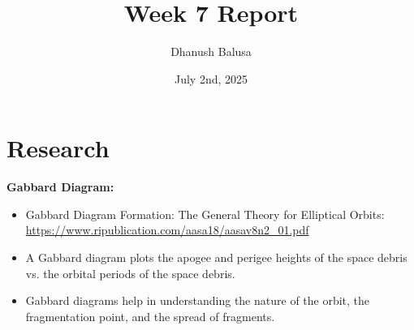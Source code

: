\documentclass[12pt]{report}
\title{Week 7 Report}
\author{Dhanush Balusa}
\date{July 2nd, 2025}
\begin{document}
\maketitle

\chapter*{Research}

\noindent \textbf{Gabbard Diagram: }
\begin{itemize}
  \item Gabbard Diagram Formation: The General Theory for Elliptical Orbits: \url{https://www.ripublication.com/aasa18/aasav8n2_01.pdf}
  \item A Gabbard diagram plots the apogee and perigee heights of the space debris vs. the orbital periods of the space debris.
  \item Gabbard diagrams help in understanding the nature of the orbit, the fragmentation point, and the spread of fragments.
\end{itemize}
\end{document}
